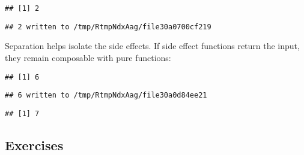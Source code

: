 \documentclass[]{book}
\newenvironment{Shaded}{\begin{snugshade}}{\end{snugshade}}
\newcommand{\DecValTok}[1]{\textcolor[rgb]{0.00,0.00,0.81}{#1}}
\newcommand{\KeywordTok}[1]{\textcolor[rgb]{0.13,0.29,0.53}{\textbf{#1}}}
\newcommand{\NormalTok}[1]{#1}
\newcommand{\OperatorTok}[1]{\textcolor[rgb]{0.81,0.36,0.00}{\textbf{#1}}}
\newcommand{\StringTok}[1]{\textcolor[rgb]{0.31,0.60,0.02}{#1}}
\begin{document}
\begin{verbatim}
## [1] 2
\end{verbatim}

\begin{verbatim}
## 2 written to /tmp/RtmpNdxAag/file30a0700cf219
\end{verbatim}

Separation helps isolate the side effects.
If side effect functions return the input, they remain composable with pure functions:

\begin{Shaded}
\end{Shaded}

\begin{verbatim}
## [1] 6
\end{verbatim}

\begin{verbatim}
## 6 written to /tmp/RtmpNdxAag/file30a0d84ee21
\end{verbatim}

\begin{verbatim}
## [1] 7
\end{verbatim}

\hypertarget{exercises-17}{%
\subsection{Exercises}\label{exercises-17}}
\end{document}
